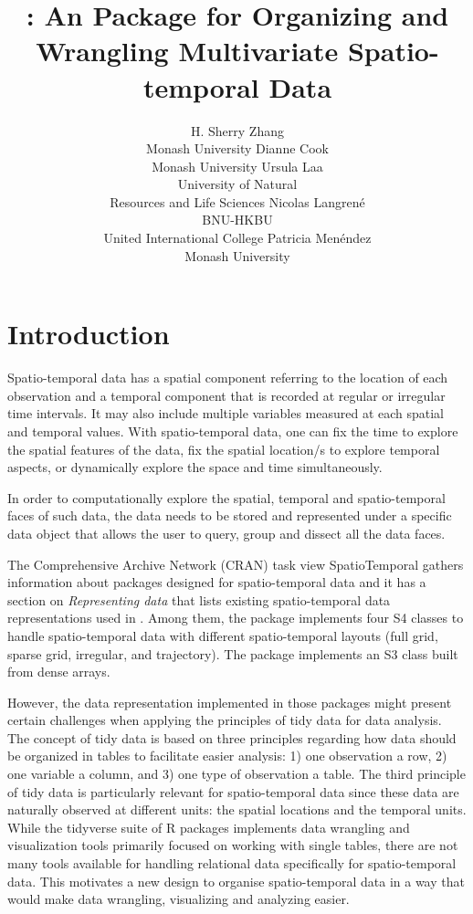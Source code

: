 \documentclass[
  shortnames]{jss}
\author{
H. Sherry Zhang\\Monash University \And Dianne Cook\\Monash University \And Ursula Laa\\University of Natural \\ Resources and Life Sciences \AND Nicolas Langrené\\BNU-HKBU \\ United International College \And Patricia Menéndez\\Monash University
}
\title{\pkg{cubble}: An \proglang{R} Package for Organizing and Wrangling Multivariate Spatio-temporal Data}
\begin{document}
\hypertarget{introduction}{%
\section{Introduction}\label{introduction}}

Spatio-temporal data has a spatial component referring to the location of each observation and a temporal component that is recorded at regular or irregular time intervals. It may also include multiple variables measured at each spatial and temporal values. With spatio-temporal data, one can fix the time to explore the spatial features of the data, fix the spatial location/s to explore temporal aspects, or dynamically explore the space and time simultaneously.

In order to computationally explore the spatial, temporal and spatio-temporal faces of such data, the data needs to be stored and represented under a specific data object that allows the user to query, group and dissect all the data faces.

The Comprehensive  Archive Network (CRAN) task view SpatioTemporal \citep{ctvspatiotemporal} gathers information about  packages designed for spatio-temporal data and it has a section on \emph{Representing data} that lists existing spatio-temporal data representations used in . Among them, the  package \citep{spacetime} implements four S4 classes to handle spatio-temporal data with different spatio-temporal layouts (full grid, sparse grid, irregular, and trajectory). The  package \citep{stars} implements an S3 class built from dense arrays.

However, the data representation implemented in those packages might present certain challenges when applying the principles of tidy data \citep{tidydata} for data analysis. The concept of tidy data is based on three principles regarding how data should be organized in tables to facilitate easier analysis: 1) one observation a row, 2) one variable a column, and 3) one type of observation a table. The third principle of tidy data is particularly relevant for spatio-temporal data since these data are naturally observed at different units: the spatial locations and the temporal units. While the tidyverse suite of R packages implements data wrangling and visualization tools primarily focused on working with single tables, there are not many tools available for handling relational data specifically for spatio-temporal data. This motivates a new design to organise spatio-temporal data in a way that would make data wrangling, visualizing and analyzing easier.
\end{document}
